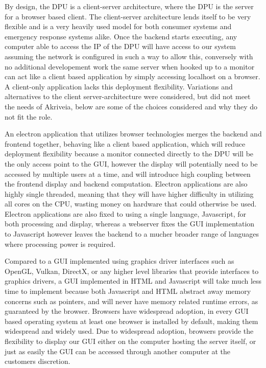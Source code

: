 \bigskip
By design, the DPU is a client-server architecture, where the DPU is the server for a browser based client.
The client-server architecture lends itself to be very flexible and is a very heavily used model for both consumer systems and emergency response systems alike.
Once the backend starts executing, any computer able to access the IP of the DPU will have access to our system assuming the network is configured in such a way to allow this, conversely with no additional developement work the same server when hooked up to a monitor can act like a client based application by simply accessing localhost on a browser.
A client-only application lacks this deployment flexibility.
Variations and alternatives to the client server-architecture were considered, but did not meet the needs of Akriveia, below are some of the choices considered and why they do not fit the role.

\bigskip
An electron application that utilizes browser technologies merges the backend and frontend together, behaving like a client based application, which will reduce deployment flexibility because a monitor connected directly to the DPU will be the only access point to the GUI, however the display will potentially need to be accessed by multiple users at a time, and will introduce high coupling between the frontend display and backend computation.
Electron applications are also highly single threaded, meaning that they will have higher difficulty in utilizing all cores on the CPU, wasting money on hardware that could otherwise be used.
Electron applications are also fixed to using a single language, Javascript, for both processing and display, whereas a webserver fixes the GUI implementation to Javascript however leaves the backend to a mucher broader range of languages where processing power is required.

\bigskip
Compared to a GUI implemented using graphics driver interfaces such as OpenGL, Vulkan, DirectX, or any higher level libraries that provide interfaces to graphics drivers, a GUI implemented in HTML and Javascript will take much less time to implement because both Javascript and HTML abstract away memory concerns such as pointers, and will never have memory related runtime errors, as guaranteed by the browser.
Browsers have widespread adoption, in every GUI based operating system at least one browser is installed by default, making them widespread and widely used.
Due to widespread adoption, browsers provide the flexibility to display our GUI either on the computer hosting the server itself, or just as easily the GUI can be accessed through another computer at the customers discretion.

